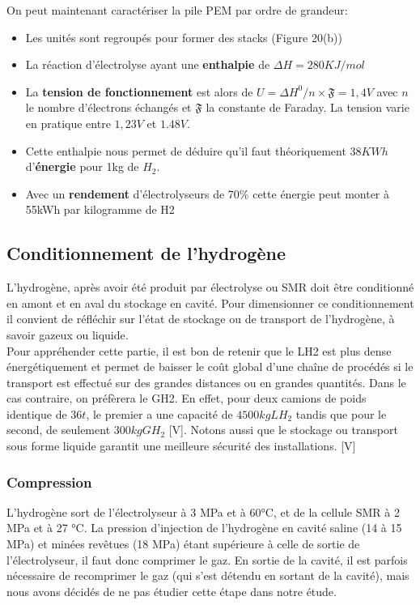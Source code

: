 \documentclass[11pt,french,a4paper]{article}
\begin{document}
On peut maintenant caractériser la pile PEM par ordre de grandeur:\\
\begin{itemize}
\item Les unités sont regroupés pour former des stacks (Figure 20(b))
\item La réaction d’électrolyse ayant une \textbf{enthalpie} de $\Delta H =280KJ/mol$
\item La \textbf{tension de fonctionnement} est alors de $U= \Delta H^0 /n\times \mathfrak{F} =1,4 V$ avec $n$ le nombre d’électrons échangés et $\mathfrak{F}$ la constante de Faraday. La tension varie en pratique entre $1,23V$ et $1.48V$. 
\item Cette enthalpie nous permet de déduire qu’il faut théoriquement $38KWh$ d'\textbf{énergie} pour 1kg de $H_2$.
\item Avec un \textbf{rendement} d’électrolyseurs de 70\% cette énergie peut monter à 55kWh par kilogramme de H2
\end{itemize}

\subsection{Conditionnement de l'hydrogène}

L’hydrogène, après avoir été produit par électrolyse ou SMR doit être conditionné en amont et en aval du stockage en cavité. Pour dimensionner ce conditionnement il convient de réfléchir sur l’état de stockage ou de transport de l’hydrogène, à savoir gazeux ou liquide. \\

Pour appréhender cette partie, il est bon de retenir que le LH2 est plus dense énergétiquement et permet de baisser le coût global d'une chaîne de procédés si le transport est effectué sur des grandes distances ou en grandes quantités. Dans le cas contraire, on préfèrera le GH2. En effet, pour deux camions de poids identique de $36t$, le premier a une capacité de $4500kg LH_2$ tandis que pour le second, de seulement $300kg GH_2$ [V]. Notons aussi que le stockage ou transport sous forme liquide garantit une meilleure sécurité des installations. [V]

\subsubsection{Compression}

L'hydrogène sort de l'électrolyseur à 3 MPa et à 60°C, et de la cellule SMR à 2 MPa et à 27 °C. La pression d'injection de l'hydrogène en cavité saline (14 à 15 MPa) et minées revêtues (18 MPa) étant supérieure à celle de sortie de l'électrolyseur, il faut donc comprimer le gaz. En sortie de la cavité, il est parfois nécessaire de recomprimer le gaz (qui s’est détendu en sortant de la cavité), mais nous avons décidés de ne pas étudier cette étape dans notre étude. \\
\end{document}
